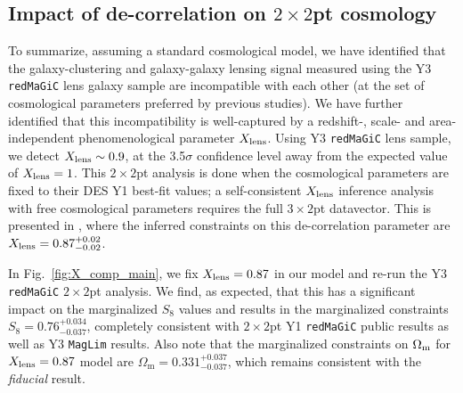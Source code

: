 \documentclass[aps, prd,twocolumn,superscriptaddress,nofootinbib,preprintnumbers]{revtex4-1}
\newcommand{\om}{\ensuremath{\Omega_{\mathrm m}}}
\newcommand{\redmagic}{\texttt{redMaGiC} }
\newcommand{\maglim}{\texttt{MagLim} }
\begin{document}
\subsection{Impact of de-correlation on $2\times 2$pt cosmology}
\label{sec:X_cosmo_impact}
To summarize, assuming a standard cosmological model, we have identified that the galaxy-clustering and galaxy-galaxy lensing signal measured using the Y3 \redmagic lens galaxy sample are incompatible with each other (at the set of cosmological parameters preferred by previous studies). We have further identified that this incompatibility is well-captured by a redshift-, scale- and area-independent phenomenological parameter $X_{\rm lens}$. Using Y3 \redmagic lens sample, we detect $X_{\rm lens} \sim 0.9$, at the 3.5$\sigma$ confidence level away from the expected value of $X_{\rm lens} = 1$. This $2\times2$pt analysis is done when the cosmological parameters are fixed to their DES Y1 best-fit values; a self-consistent $X_{\rm lens}$ inference analysis with free cosmological parameters requires the full $3\times2$pt datavector. This is presented in \citet*{y3-3x2ptkp}, where the inferred constraints on this de-correlation parameter are $X_{\rm lens} = 0.87^{+0.02}_{-0.02}$. 

In Fig.~\ref{fig:X_comp_main}, we fix  $X_{\rm lens} = 0.87$ in our model and re-run the Y3 \redmagic $2\times2$pt analysis. We find, as expected, that this has a significant impact on the marginalized $S_8$ values and results in the marginalized constraints $S_8 = 0.76_{-0.037}^{+0.034}$, completely consistent with $2\times2$pt Y1 \redmagic public results as well as Y3 \maglim results. Also note that the marginalized constraints on $\Omega_{\rm m}$ for $X_{\rm lens} = 0.87$ model are $\om = 0.331^{+0.037}_{-0.037}$, which remains consistent with the \textit{fiducial} result. 

\end{document}
